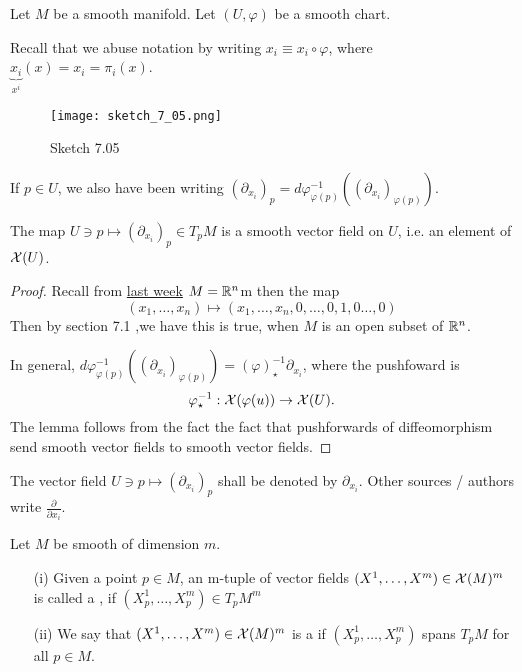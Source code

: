 Let \(M\) be a smooth manifold. Let \((U,\varphi)\) be a smooth chart. 

Recall that we abuse notation by writing \(x_i\equiv x_i\circ \varphi\), where \(\underbrace{x_i}_{x^i}(x)=x_i=\pi_i(x)\).
\begin{figure}[H]\label{fig:7.05}
    \centering
    \texttt{[image: sketch\_7\_05.png]}
    \caption{Sketch 7.05}
\end{figure}

If \(p\in U\), we also have been writing \((\partial_{x_i})_p=d\varphi_{\varphi(p)}^{-1}((\partial_{x_i})_{\varphi(p)})\).

\begin{lemma}\label{lem:7.7}
    The map \(U\ni p\mapsto (\partial_{x_i})_p\in T_p M\) is a smooth vector field on \(U\), i.e. an element 
    of \(\mathcal{X}(U)\).
\end{lemma}

\begin{proof}
    
    Recall from \href{lec15}{last week}  
    \(M=\mathbb{R}^n\)m then the map \[(x_1,\dots,x_n)\mapsto (x_1,\dots,x_n,0,\dots,0,1,0\dots,0)\]
    Then by section 7.1 %
    ,we have this is true, when \(M\) is an open subset of \(\mathbb{R}^n\).

    In general, \(d\varphi_{\varphi(p)}^{-1}((\partial_{x_i})_{\varphi(p)})=(\varphi)^{-1}_\star \partial_{x_i}\), where the pushfoward is 
    \[\varphi_\star^{-1}:\mathcal{X}(\varphi(u))\to\mathcal{X}(U).\]
    The lemma follows from the fact the fact that pushforwards of diffeomorphism send smooth vector fields to 
    smooth vector fields.
\end{proof}
 The vector field \(U\ni p\mapsto (\partial_{x_i})_p\) shall be denoted by \(\partial_{x_i}\).
Other sources / authors write \(\frac{\partial}{\partial x_i}\).

\begin{definition*}
    Let \(M\) be smooth of dimension \(m\).
    \begin{enumerate}
        \item[(i)] Given a point \(p\in M\), an m-tuple of vector fields \((X^1,\dots,X^m)\in \mathcal{X}(M)^m\) is called a , if \((X_p^1,\dots,X_p^m)\in T_p M^m\)
        \item[(ii)] We say that \((X^1,\dots,X^m)\in \mathcal{X}(M)^m\) is a  if \((X_p^1,\dots,X_p^m)\) spans \(T_pM\) for all \(p\in M\). 
    \end{enumerate}
\end{definition*}

